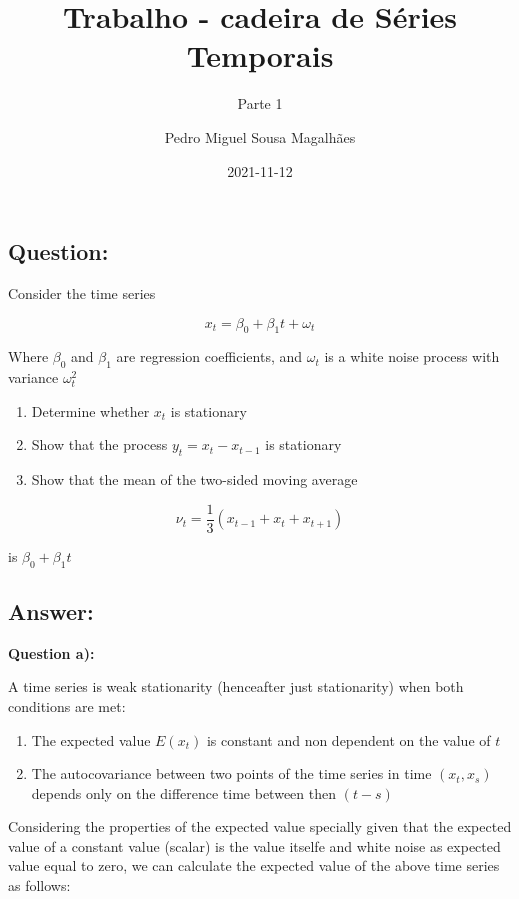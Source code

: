 \documentclass[
]{article}
\title{Trabalho - cadeira de Séries Temporais}
\subtitle{Parte 1}
\author{Pedro Miguel Sousa Magalhães}
\date{2021-11-12}
\providecommand{\tightlist}{%
  \setlength{\itemsep}{0pt}\setlength{\parskip}{0pt}}
\begin{document}
\maketitle

\hypertarget{question}{%
\subsection{Question:}\label{question}}

Consider the time series

\[ x_t = \beta_0 + \beta_1t + \omega_t\]

Where \(\beta_0\) and \(\beta_1\) are regression coefficients, and
\(\omega_t\) is a white noise process with variance \(\omega_t^2\)

\begin{enumerate}
\def\labelenumi{(\alph{enumi})}
\tightlist
\item
  Determine whether \(x_t\) is stationary
\item
  Show that the process \(y_t = x_t - x_{t-1}\) is stationary
\item
  Show that the mean of the two-sided moving average
\end{enumerate}

\[ \nu_t = \frac{1}{3}(x_{t-1} + x_t + x_{t+1})\]

is \(\beta_0 + \beta_1t\)

\hypertarget{answer}{%
\subsection{Answer:}\label{answer}}

\textbf{Question a):}

A time series is weak stationarity (henceafter just stationarity) when
both conditions are met:

\begin{enumerate}
\def\labelenumi{\roman{enumi})}
\tightlist
\item
  The expected value \(E(x_t)\) is constant and non dependent on the
  value of \(t\)
\item
  The autocovariance between two points of the time series in time
  \((x_t, x_s)\) depends only on the difference time between then
  \((t-s)\)
\end{enumerate}

Considering the properties of the expected value specially given that
the expected value of a constant value (scalar) is the value itselfe and
white noise as expected value equal to zero, we can calculate the
expected value of the above time series as follows:
\end{document}

